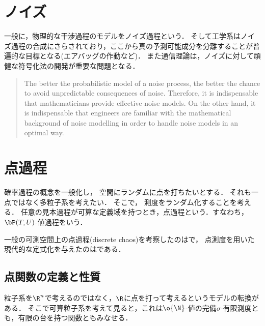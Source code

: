 \documentclass[uplatex,dvipdfmx]{jsreport}
\begin{document}
\section{ノイズ}

一般に，物理的な干渉過程のモデルをノイズ過程という．
そして工学系はノイズ過程の合成にさらされており，ここから真の予測可能成分を分離することが普遍的な目標となる(エアバッグの作動など)．
また通信理論は，ノイズに対して頑健な符号化法の開発が重要な問題となる．
\begin{quote}
    The
    better the probabilistic model of a noise process, the better the chance to
    avoid unpredictable consequences of noise. Therefore, it is indispensable
    that mathematicians provide effective noise models. On the other hand, it is
    indispensable that engineers are familiar with the mathematical background
    of noise modelling in order to handle noise models in an optimal way.\cite{Schaffler}
\end{quote}

\section{点過程}

\begin{tcolorbox}[colframe=ForestGreen, colback=ForestGreen!10!white,breakable,colbacktitle=ForestGreen!40!white,coltitle=black,fonttitle=\bfseries\sffamily,
title=]
    確率過程の概念を一般化し，
    空間にランダムに点を打ちたいとする．
    それも一点ではなく多粒子系を考えたい．
    そこで，
    測度をランダム化することを考える．
    任意の見本過程が可算な定義域を持つとき，点過程という．すなわち，$\bP(T,U)$-値過程をいう．
\end{tcolorbox}

\begin{history}
    一般の可測空間上の点過程(discrete chaos)を考察したのは\cite{Wiener-Wintner43-DiscreteChaos}で，
    点測度を用いた現代的な定式化を与えたのは\cite{Moyal62-PointProcess}である．
\end{history}

\subsection{点関数の定義と性質}

\begin{tcolorbox}[colframe=ForestGreen, colback=ForestGreen!10!white,breakable,colbacktitle=ForestGreen!40!white,coltitle=black,fonttitle=\bfseries\sffamily,
title=]
    粒子系を$\R^n$で考えるのではなく，$\R$に点を打って考えるというモデルの転換がある．
    そこで可算粒子系を考えて見ると，これは$\o{\N}$-値の完備$\sigma$-有限測度とも，有限の台を持つ関数ともみなせる．
\end{tcolorbox}
\end{document}
